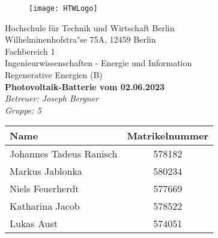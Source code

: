 \begin{titlepage}

		\begin{figure}[h] 
				\begin{flushright}
			\texttt{[image: HTWLogo]}\\
				\end{flushright}
		\end{figure}
		
	\begin{center}
	
		\vspace*{\fill}
		{\Large Hochschule f{\"u}r Technik und Wirtschaft Berlin}\\
			\bigskip
			Wilhelminenhofstra"se 75A, 12459 Berlin\\
			\bigskip
		Fachbereich 1 \\Ingenieurwissenschaften - Energie und Information\\Regenerative Energien (B)\\
		\vfill
		 \textcolor{HTWGreen}{\textbf{\Large{Photovoltaik-Batterie vom 02.06.2023}}}\\
		\textit{Betreuer: Joseph Bergner}\\
		\textit{Gruppe: 5}\\
	\vfill
	\end{center}
\vfill
\begin{table}[H]
			\centering
			\begin{tabular}{|l|c|}
			\hline
			\rowcolor[cmyk]{0.55, 0.00, 1.00, 0.00} \textbf{Name} & \textbf{Matrikelnummer}  \\
			\hline
			Johannes Tadeus Ranisch     & 578182\\
			\hline
			Markus Jablonka       & 580234\\
			\hline
			Niels Feuerherdt      & 577669\\
			\hline
			Katharina Jacob 			 & 578522\\
			\hline
			Lukas Aust			 & 574051\\
			\hline
			\end{tabular}
\end{table}
\end{titlepage}
